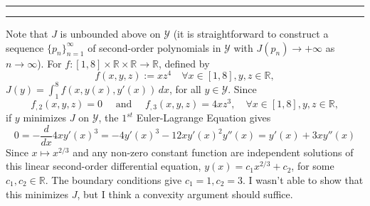 \documentclass[11pt]{article}
\newcounter{questionCounter}
\newcounter{partCounter}[questionCounter]
\newenvironment{question}[2][\arabic{questionCounter}]{%
    \setcounter{partCounter}{0}%
    \vspace{.25in} \hrule \vspace{0.5em}%
        \noindent{\bf #2}%
    \vspace{0.8em} \hrule \vspace{.10in}%
    \addtocounter{questionCounter}{1}%
}{}
\newcommand{\R}{\mathbb{R}}             %
\newcommand{\Y}{\mathscr{Y}}            %
\begin{document}
\vspace{-3mm}
\begin{question}{Problem 6}
Note that $J$ is unbounded above on $\Y$ (it is straightforward to
construct a sequence $\{p_n\}_{n = 1}^\infty$ of second-order polynomials in
$\Y$ with $J(p_n) \to +\infty$ as $n \to \infty$).
For $f : [1,8] \times \R \times \R \to \R$, defined by
\[f(x,y,z) := xz^4 \quad \forall x \in [1,8], y,z \in \R,\]
$J(y) = \int_1^8 f(x,y(x),y'(x)) \, dx$, for all $y \in \Y$.
Since
\[f_{,2}(x,y,z)
    = 0
\quad \mbox{ and } \quad
f_{,3}(x,y,z)
    = 4xz^3, \quad \forall x \in [1,8], y,z \in \R,
\]
if $y$ minimizes $J$ on $\Y$, the $1^{st}$ Euler-Lagrange Equation gives
\[0
    = - \frac{d}{dx} 4xy'(x)^3
    = - 4 y'(x)^3 - 12xy'(x)^2y''(x)
    = y'(x) + 3x y''(x)
\]
Since $x \mapsto x^{2/3}$ and any non-zero constant function are independent
solutions of this linear second-order differential equation,
$y(x) = c_1 x^{2/3} + c_2$, for some $c_1,c_2 \in \R$. The boundary conditions 
give $c_1 = 1, c_2 = 3$. I wasn't able to show that this minimizes $J$, but I
think a convexity argument should suffice.
\end{question}
\end{document}
